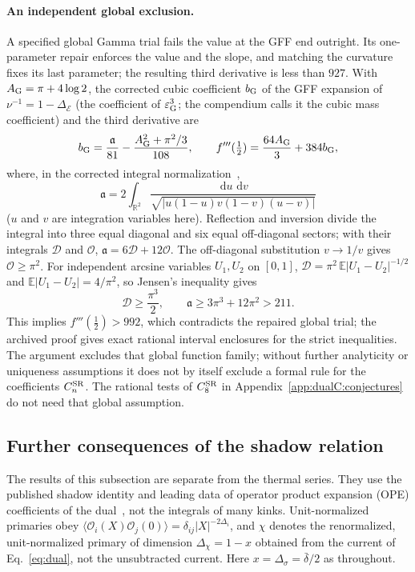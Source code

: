 \documentclass[11pt,a4paper]{article}
\numberwithin{equation}{section}
\newcommand{\dd}{\,\mathrm d}
\newcommand{\De}{\Delta_{\mathcal E}}
\newcommand{\Ds}{\Delta_\sigma}
\newcommand{\CSR}{C^{\rm SR}}
\newcommand{\db}{\bar\delta}
\begin{document}
\paragraph{An independent global exclusion.} A specified global Gamma trial fails the value at the GFF end outright.
Its one-parameter repair enforces the value and the slope, and matching the curvature fixes its last parameter; the
resulting third derivative is less than $927$. With $A_{\rm G}=\pi+4\log2$, the corrected cubic coefficient
$b_{\rm G}$ of the GFF expansion of $\nu^{-1}=1-\De$ (the coefficient of $\varepsilon_{\rm G}^3$; the compendium calls it
the cubic mass coefficient) and the third derivative are
\begin{equation}
 b_{\rm G}=\frac{\mathfrak a}{81}-\frac{A_{\rm G}^2+\pi^2/3}{108},\qquad f'''(\tfrac12)=\frac{64A_{\rm G}}{3}+384b_{\rm G},
\end{equation}
where, in the corrected integral normalization~\cite{Benedetti:2024mqx},
\begin{equation}
 \mathfrak a=2\int_{\mathbb R^2}\frac{\dd u\,\dd v}{\sqrt{|u(1-u)v(1-v)(u-v)|}}
\end{equation}
($u$ and $v$ are integration variables here). Reflection and inversion divide the integral into three equal diagonal
and six equal off-diagonal sectors; with their integrals $\mathcal D$ and $\mathcal O$, $\mathfrak a=6\mathcal
D+12\mathcal O$. The off-diagonal substitution $v\to1/v$ gives $\mathcal O\ge\pi^2$. For independent arcsine variables
$U_1,U_2$ on $[0,1]$, $\mathcal D=\pi^2\,\mathbb E|U_1-U_2|^{-1/2}$ and $\mathbb E|U_1-U_2|=4/\pi^2$, so Jensen's
inequality gives
\begin{equation}
 \mathcal D\ge\frac{\pi^3}{2},\qquad \mathfrak a\ge3\pi^3+12\pi^2>211 .
\end{equation}
This implies $f'''(\frac12)>992$, which contradicts the repaired global trial; the archived proof gives exact rational
interval enclosures for the strict inequalities. The argument excludes that global function family; without further
analyticity or uniqueness assumptions it does not by itself exclude a formal rule for the coefficients $\CSR_n$. The
rational tests of $\CSR_8$ in Appendix~\ref{app:dualC:conjectures} do not need that global assumption.

\subsection{Further consequences of the shadow relation}\label{app:dualC:shadow}
The results of this subsection are separate from the thermal series. They use the published shadow identity and
leading data of operator product expansion (OPE) coefficients of the dual~\cite{Benedetti:2025nzp}, not the integrals
of many kinks. Unit-normalized primaries obey $\langle\mathcal O_i(X)\mathcal O_j(0)\rangle=\delta_{ij}|X|^{-2\Delta_i}$,
and $\chi$ denotes the renormalized, unit-normalized primary of dimension $\Delta_\chi=1-x$ obtained from the current
of Eq.~\eqref{eq:dual}, not the unsubtracted current. Here $x=\Ds=\db/2$ as throughout.
\end{document}
